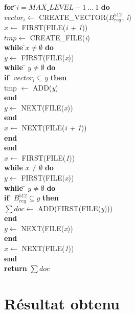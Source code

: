 \begin{flushleft}
\begin{framed}
\begin{tabbing}
			\textbf{for }\=$i = MAX\_LEVEL - 1\ ...\ 1$ \textbf{do}\\
					\> $vector_i \leftarrow$ CREATE\_VECTOR($B^{512}_{req}$, \textit{i})\\
					\> $x \leftarrow$ FIRST(FILE(\textit{i + 1}))\\
					\> $tmp \leftarrow$ CREATE\_FILE(\textit{i})\\
					\> \textbf{while }\=$x \neq \emptyset$\textbf{ do}\\
					\> \> $y \leftarrow$ FIRST(FILE(\textit{x}))\\
					\> \> \textbf{while }\= $y \neq \emptyset$ \textbf{ do}\\
					\> \> \> \textbf{if }\= $vector_i \subseteq y$\textbf{ then}\\
					\> \> \> \> tmp $\leftarrow$ ADD(\textit{y})\\
					\> \> \> \textbf{end}\\
					\> \> \> $y \leftarrow$ NEXT(FILE(\textit{x}))\\
					\> \> \textbf{end}\\
					\> \> $x \leftarrow$ NEXT(FILE(\textit{i + 1}))\\
					\> \textbf{end}\\
			\textbf{end}	\\
			$x \leftarrow$ FIRST(FILE(\textit{1}))\\
			\textbf{while }\=$x \neq \emptyset$\textbf{ do}\\
					\> $y \leftarrow $ FIRST(FILE(\textit{x}))\\
					\> \textbf{while }\= $y \neq \emptyset$\textbf{ do}\\
					\> \> \textbf{if }\= $B^{512}_{req} \subseteq y$\textbf{ then}\\
					\> \> \> $\sum doc \leftarrow$ ADD(FIRST(FILE(\textit{y})))\\
					\> \> \textbf{end}\\
					\> \> $y \leftarrow$ NEXT(FILE(\textit{x}))\\
					\> \textbf{end}\\
					\> $x \leftarrow$ NEXT(FILE(\textit{1}))\\
			\textbf{end}\\
			\textbf{return} $\sum doc$
	    	\end{tabbing}		
	\end{framed}
\end{flushleft}

\chapter{Résultat obtenu}
